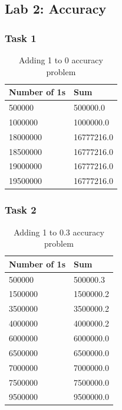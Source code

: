 \documentclass[12pt]{article}
\begin{document}
\subsection*{Lab 2: Accuracy}

  \subsubsection*{Task 1}
  \begin{table}[H]
    \centering
    \begin{tabular}{|l|l|}
      \hline
      Number of 1s & Sum        \\ \hline
      500000       & 500000.0   \\ \hline
      1000000      & 1000000.0  \\ \hline
      18000000     & 16777216.0 \\ \hline
      18500000     & 16777216.0 \\ \hline
      19000000     & 16777216.0 \\ \hline
      19500000     & 16777216.0 \\ \hline
    \end{tabular}
    \caption{Adding 1 to 0 accuracy problem}
    \label{fig:lab2_task1}
  \end{table}

  \subsubsection*{Task 2}
  \begin{table}[H]
    \centering
    \begin{tabular}{|l|l|}
      \hline
      Number of 1s & Sum       \\ \hline
      500000       & 500000.3  \\ \hline
      1500000      & 1500000.2 \\ \hline
      3500000      & 3500000.2 \\ \hline
      4000000      & 4000000.2 \\ \hline
      6000000      & 6000000.0 \\ \hline
      6500000      & 6500000.0 \\ \hline
      7000000      & 7000000.0 \\ \hline
      7500000      & 7500000.0 \\ \hline
      9500000      & 9500000.0 \\ \hline
    \end{tabular}
    \caption{Adding 1 to 0.3 accuracy problem}
    \label{fig:lab2_task2}
  \end{table}
\end{document}
